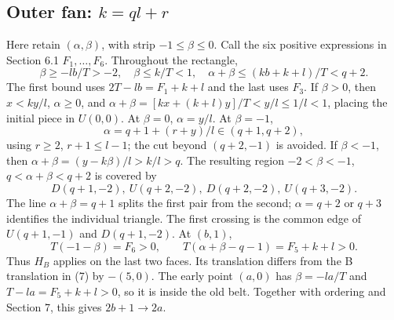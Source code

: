 \documentclass[11pt]{amsart}
\begin{document}
\subsection{Outer fan: \texorpdfstring{$k=ql+r$}{k=ql+r}}
Here retain $(\alpha,\beta)$, with strip $-1\le\beta\le0$.
Call the six positive expressions in Section 6.1 $F_1,\ldots,F_6$.
Throughout the rectangle,
\[
\beta\ge-lb/T>-2,\quad \beta\le k/T<1,\quad
\alpha+\beta\le(kb+k+l)/T<q+2.
\]
The first bound uses $2T-lb=F_1+k+l$ and the last uses $F_3$.
If $\beta>0$, then $x<ky/l$, $\alpha\ge0$, and
$\alpha+\beta=[kx+(k+l)y]/T<y/l\le1/l<1$, placing the initial
piece in $U(0,0)$. At $\beta=0$, $\alpha=y/l$. At $\beta=-1$,
\[
 \alpha=q+1+(r+y)/l\in(q+1,q+2),
\]
using $r\ge2$, $r+1\le l-1$; the cut beyond $(q+2,-1)$ is avoided.
If $\beta<-1$, then $\alpha+\beta=(y-k\beta)/l>k/l>q$.
The resulting region $-2<\beta<-1$, $q<\alpha+\beta<q+2$ is
covered by
\[
D(q+1,-2),\ U(q+2,-2),\ D(q+2,-2),\ U(q+3,-2).
\]
The line $\alpha+\beta=q+1$ splits the first pair from the second;
$\alpha=q+2$ or $q+3$ identifies the individual triangle. The first
crossing is the common edge of $U(q+1,-1)$ and $D(q+1,-2)$.
At $(b,1)$,
\[
T(-1-\beta)=F_6>0,\qquad
T(\alpha+\beta-q-1)=F_5+k+l>0.
\]
Thus $H_B$ applies on the last two faces. Its translation differs from
the B translation in (7) by $-(5,0)$. The early point $(a,0)$ has
$\beta=-la/T$ and $T-la=F_5+k+l>0$, so it is inside the old belt.
Together with ordering and Section 7, this gives $2b+1\to2a$.
\end{document}
